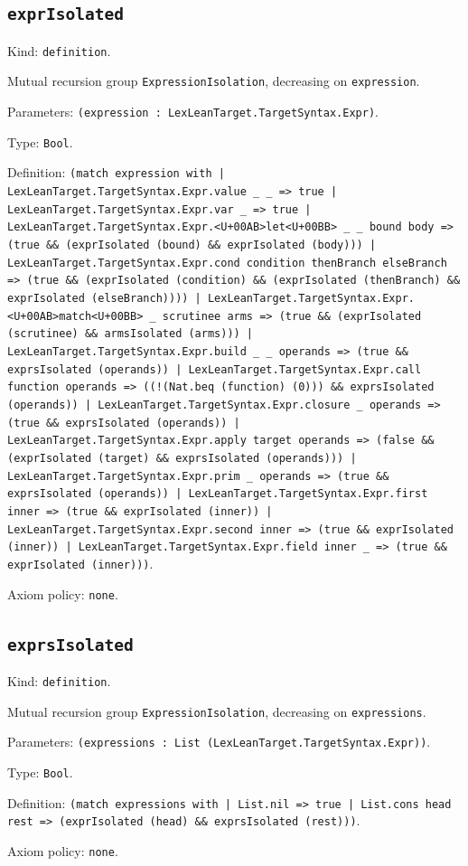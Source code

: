 \documentclass[11pt]{article}
\begin{document}
\subsection*{\texttt{exprIsolated}}
\noindent Kind: \texttt{definition}.\par
\noindent Mutual recursion group \texttt{ExpressionIsolation}, decreasing on \texttt{expression}.\par
\noindent Parameters: \texttt{(expression : LexLeanTarget.TargetSyntax.Expr)}.\par
\noindent Type: \texttt{Bool}.\par
\noindent Definition: \texttt{(match expression with | LexLeanTarget.TargetSyntax.Expr.value \_ \_ => true | LexLeanTarget.TargetSyntax.Expr.var \_ => true | LexLeanTarget.TargetSyntax.Expr.<U+00AB>let<U+00BB> \_ \_ bound body => (true \&\& (exprIsolated (bound) \&\& exprIsolated (body))) | LexLeanTarget.TargetSyntax.Expr.cond condition thenBranch elseBranch => (true \&\& (exprIsolated (condition) \&\& (exprIsolated (thenBranch) \&\& exprIsolated (elseBranch)))) | LexLeanTarget.TargetSyntax.Expr.<U+00AB>match<U+00BB> \_ scrutinee arms => (true \&\& (exprIsolated (scrutinee) \&\& armsIsolated (arms))) | LexLeanTarget.TargetSyntax.Expr.build \_ \_ operands => (true \&\& exprsIsolated (operands)) | LexLeanTarget.TargetSyntax.Expr.call function operands => ((!(Nat.beq (function) (0))) \&\& exprsIsolated (operands)) | LexLeanTarget.TargetSyntax.Expr.closure \_ operands => (true \&\& exprsIsolated (operands)) | LexLeanTarget.TargetSyntax.Expr.apply target operands => (false \&\& (exprIsolated (target) \&\& exprsIsolated (operands))) | LexLeanTarget.TargetSyntax.Expr.prim \_ operands => (true \&\& exprsIsolated (operands)) | LexLeanTarget.TargetSyntax.Expr.first inner => (true \&\& exprIsolated (inner)) | LexLeanTarget.TargetSyntax.Expr.second inner => (true \&\& exprIsolated (inner)) | LexLeanTarget.TargetSyntax.Expr.field inner \_ => (true \&\& exprIsolated (inner)))}.\par
\noindent Axiom policy: \texttt{none}.\par
\subsection*{\texttt{exprsIsolated}}
\noindent Kind: \texttt{definition}.\par
\noindent Mutual recursion group \texttt{ExpressionIsolation}, decreasing on \texttt{expressions}.\par
\noindent Parameters: \texttt{(expressions : List (LexLeanTarget.TargetSyntax.Expr))}.\par
\noindent Type: \texttt{Bool}.\par
\noindent Definition: \texttt{(match expressions with | List.nil => true | List.cons head rest => (exprIsolated (head) \&\& exprsIsolated (rest)))}.\par
\noindent Axiom policy: \texttt{none}.\par
\end{document}

